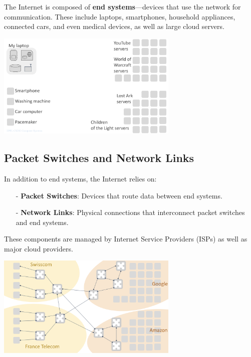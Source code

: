 The Internet is composed of \textbf{end systems}—devices that use the network for communication. These include laptops, smartphones, household appliances, connected cars, and even medical devices, as well as large cloud servers.

\begin{center}
  \includegraphics[width=0.65\textwidth]{chapters/L1/images/endsys.png}
\end{center}

\newpage
\subsection{Packet Switches and Network Links}

In addition to end systems, the Internet relies on:
\begin{itemize}
  \item[-] \textbf{Packet Switches}: Devices that route data between end systems.
  \item[-] \textbf{Network Links}: Physical connections that interconnect packet switches and end systems.
\end{itemize}

These components are managed by Internet Service Providers (ISPs) as well as major cloud providers.

\begin{center}
  \includegraphics[width=0.65\textwidth]{chapters/L1/images/internet_schema.png}
\end{center}

